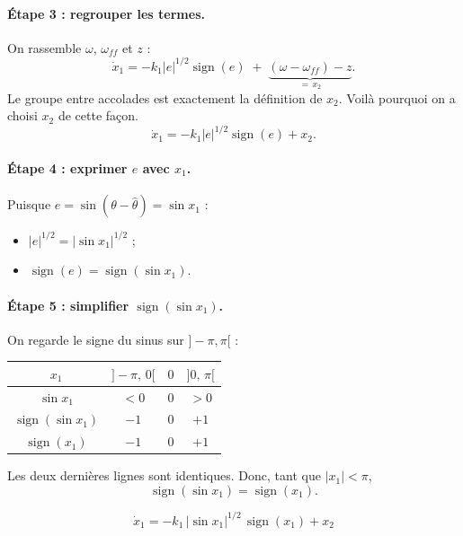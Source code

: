 \documentclass[11pt,a4paper]{article}
\newcommand{\sign}{\operatorname{sign}}
\newcommand{\hth}{\hat{\theta}}
\begin{document}
\paragraph{Étape 3 : regrouper les termes.} On rassemble $\omega$, $\omega_{ff}$ et $z$ :
\begin{equation}
\dot x_1 = -k_1|e|^{1/2}\sign(e) \;+\; \underbrace{(\omega - \omega_{ff}) - z}_{=\,x_2}.
\end{equation}
Le groupe entre accolades est exactement la définition de $x_2$. Voilà pourquoi on a choisi
$x_2$ de cette façon.
\begin{equation}
\dot x_1 = -k_1|e|^{1/2}\sign(e) + x_2 .
\end{equation}

\paragraph{Étape 4 : exprimer $e$ avec $x_1$.} Puisque $e=\sin(\theta-\hth)=\sin x_1$ :
\begin{itemize}
  \item $|e|^{1/2} = |\sin x_1|^{1/2}$ ;
  \item $\sign(e) = \sign(\sin x_1)$.
\end{itemize}

\paragraph{Étape 5 : simplifier $\sign(\sin x_1)$.} On regarde le signe du sinus sur $]-\pi,\pi[$ :
\begin{center}
\begin{tabular}{c|ccc}
$x_1$ & $]-\pi,\,0[$ & $0$ & $]0,\,\pi[$ \\
\hline
$\sin x_1$ & $<0$ & $0$ & $>0$ \\
$\sign(\sin x_1)$ & $-1$ & $0$ & $+1$ \\
$\sign(x_1)$ & $-1$ & $0$ & $+1$
\end{tabular}
\end{center}
Les deux dernières lignes sont identiques. Donc, tant que $|x_1|<\pi$,
\begin{equation}
\sign(\sin x_1) = \sign(x_1).
\end{equation}

\begin{resultat}
\begin{equation}
\dot x_1 = -k_1\,|\sin x_1|^{1/2}\,\sign(x_1) + x_2 \tag{17}
\end{equation}
\end{resultat}
\end{document}
